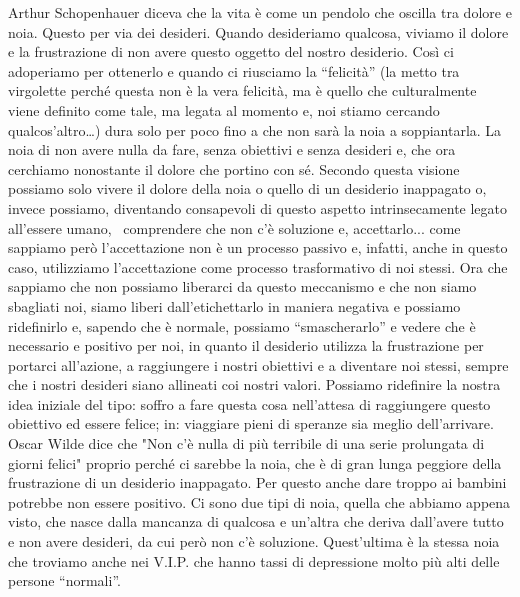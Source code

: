 \documentclass[12pt]{book} %
\begin{document}
Arthur Schopenhauer diceva che la vita è come un pendolo che oscilla tra dolore e noia. Questo per via dei desideri.
Quando desideriamo qualcosa, viviamo il dolore e la frustrazione di non avere questo oggetto del nostro desiderio. Così
ci adoperiamo per ottenerlo e quando ci riusciamo la “felicità” (la metto tra virgolette perché questa non è la vera
felicità, ma è quello che culturalmente viene definito come tale, ma legata al momento e, noi stiamo cercando
qualcos'altro…) dura solo per poco fino a che non sarà la noia a soppiantarla. La noia di non
avere nulla da fare, senza obiettivi e senza desideri e, che ora cerchiamo nonostante il dolore che portino con sé.
Secondo questa visione possiamo solo vivere il dolore della noia o quello di un desiderio inappagato o, invece
possiamo, diventando consapevoli di questo aspetto intrinsecamente legato all'essere umano,
\ comprendere che non c'è soluzione e, accettarlo... come sappiamo però
l'accettazione non è un processo passivo e, infatti, anche in questo caso, utilizziamo
l'accettazione come processo trasformativo di noi stessi. Ora che sappiamo che non possiamo
liberarci da questo meccanismo e che non siamo sbagliati noi, siamo liberi dall'etichettarlo in
maniera negativa e possiamo ridefinirlo e, sapendo che è normale, possiamo “smascherarlo” e vedere che è necessario e
positivo per noi, in quanto il desiderio utilizza la frustrazione per portarci all'azione, a
raggiungere i nostri obiettivi e a diventare noi stessi, sempre che i nostri desideri siano allineati coi nostri
valori. Possiamo ridefinire la nostra idea iniziale del tipo: soffro a fare questa cosa
nell'attesa di raggiungere questo obiettivo ed essere felice; in: viaggiare pieni di speranze sia
meglio dell'arrivare. Oscar Wilde dice che "Non c'è nulla di più terribile di
una serie prolungata di giorni felici" proprio perché ci sarebbe la noia, che è di gran lunga
peggiore della frustrazione di un desiderio inappagato. Per questo anche dare troppo ai bambini potrebbe non essere
positivo. Ci sono due tipi di noia, quella che abbiamo appena visto, che nasce dalla mancanza di qualcosa e
un'altra che deriva dall'avere tutto e non avere desideri, da cui però non
c'è soluzione. Quest'ultima è la stessa noia che troviamo anche nei V.I.P.
che hanno tassi di depressione molto più alti delle persone “normali”.
\end{document}
